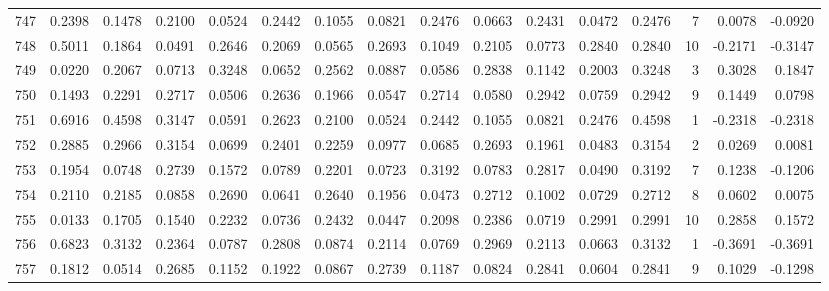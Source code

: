 \begin{tabular}{lrrrrrrrrrrrrrrr}
747 &      0.2398 &  0.1478 &  0.2100 &  0.0524 &  0.2442 &  0.1055 &  0.0821 &  0.2476 &  0.0663 &  0.2431 &   0.0472 &     0.2476 &      7 &                    0.0078 &                    -0.0920 \\
748 &      0.5011 &  0.1864 &  0.0491 &  0.2646 &  0.2069 &  0.0565 &  0.2693 &  0.1049 &  0.2105 &  0.0773 &   0.2840 &     0.2840 &     10 &                   -0.2171 &                    -0.3147 \\
749 &      0.0220 &  0.2067 &  0.0713 &  0.3248 &  0.0652 &  0.2562 &  0.0887 &  0.0586 &  0.2838 &  0.1142 &   0.2003 &     0.3248 &      3 &                    0.3028 &                     0.1847 \\
750 &      0.1493 &  0.2291 &  0.2717 &  0.0506 &  0.2636 &  0.1966 &  0.0547 &  0.2714 &  0.0580 &  0.2942 &   0.0759 &     0.2942 &      9 &                    0.1449 &                     0.0798 \\
751 &      0.6916 &  0.4598 &  0.3147 &  0.0591 &  0.2623 &  0.2100 &  0.0524 &  0.2442 &  0.1055 &  0.0821 &   0.2476 &     0.4598 &      1 &                   -0.2318 &                    -0.2318 \\
752 &      0.2885 &  0.2966 &  0.3154 &  0.0699 &  0.2401 &  0.2259 &  0.0977 &  0.0685 &  0.2693 &  0.1961 &   0.0483 &     0.3154 &      2 &                    0.0269 &                     0.0081 \\
753 &      0.1954 &  0.0748 &  0.2739 &  0.1572 &  0.0789 &  0.2201 &  0.0723 &  0.3192 &  0.0783 &  0.2817 &   0.0490 &     0.3192 &      7 &                    0.1238 &                    -0.1206 \\
754 &      0.2110 &  0.2185 &  0.0858 &  0.2690 &  0.0641 &  0.2640 &  0.1956 &  0.0473 &  0.2712 &  0.1002 &   0.0729 &     0.2712 &      8 &                    0.0602 &                     0.0075 \\
755 &      0.0133 &  0.1705 &  0.1540 &  0.2232 &  0.0736 &  0.2432 &  0.0447 &  0.2098 &  0.2386 &  0.0719 &   0.2991 &     0.2991 &     10 &                    0.2858 &                     0.1572 \\
756 &      0.6823 &  0.3132 &  0.2364 &  0.0787 &  0.2808 &  0.0874 &  0.2114 &  0.0769 &  0.2969 &  0.2113 &   0.0663 &     0.3132 &      1 &                   -0.3691 &                    -0.3691 \\
757 &      0.1812 &  0.0514 &  0.2685 &  0.1152 &  0.1922 &  0.0867 &  0.2739 &  0.1187 &  0.0824 &  0.2841 &   0.0604 &     0.2841 &      9 &                    0.1029 &                    -0.1298 \\

\end{tabular}
